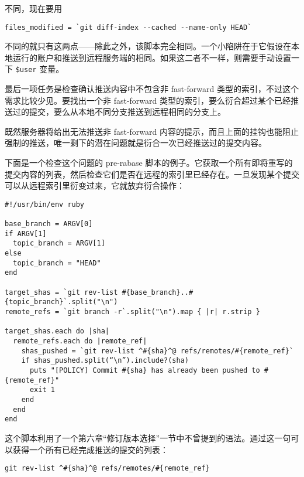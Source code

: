 \documentclass[a4paper]{book}
\begin{document}
不同，现在要用

\begin{shaded}\begin{verbatim}
files_modified = `git diff-index --cached --name-only HEAD`
\end{verbatim}\end{shaded}

不同的就只有这两点------除此之外，该脚本完全相同。一个小陷阱在于它假设在本地运行的账户和推送到远程服务端的相同。如果这二者不一样，则需要手动设置一下 \texttt{\$user} 变量。

最后一项任务是检查确认推送内容中不包含非 fast-forward 类型的索引，不过这个需求比较少见。要找出一个非 fast-forward 类型的索引，要么衍合超过某个已经推送过的提交，要么从本地不同分支推送到远程相同的分支上。

既然服务器将给出无法推送非 fast-forward 内容的提示，而且上面的挂钩也能阻止强制的推送，唯一剩下的潜在问题就是衍合一次已经推送过的提交内容。

下面是一个检查这个问题的 pre-rabase 脚本的例子。它获取一个所有即将重写的提交内容的列表，然后检查它们是否在远程的索引里已经存在。一旦发现某个提交可以从远程索引里衍变过来，它就放弃衍合操作：

\begin{shaded}\begin{verbatim}
#!/usr/bin/env ruby

base_branch = ARGV[0]
if ARGV[1]
  topic_branch = ARGV[1]
else
  topic_branch = "HEAD"
end

target_shas = `git rev-list #{base_branch}..#{topic_branch}`.split("\n")
remote_refs = `git branch -r`.split("\n").map { |r| r.strip }

target_shas.each do |sha|
  remote_refs.each do |remote_ref|
    shas_pushed = `git rev-list ^#{sha}^@ refs/remotes/#{remote_ref}`
    if shas_pushed.split(“\n”).include?(sha)
      puts "[POLICY] Commit #{sha} has already been pushed to #{remote_ref}"
      exit 1
    end
  end
end
\end{verbatim}\end{shaded}

这个脚本利用了一个第六章“修订版本选择”一节中不曾提到的语法。通过这一句可以获得一个所有已经完成推送的提交的列表：

\begin{shaded}\begin{verbatim}
git rev-list ^#{sha}^@ refs/remotes/#{remote_ref}
\end{verbatim}\end{shaded}
\end{document}
